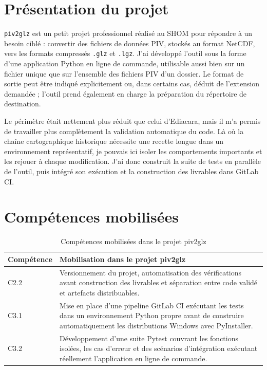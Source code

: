 \section{Présentation du projet}

\texttt{piv2glz} est un petit projet professionnel réalisé au SHOM pour répondre à un besoin ciblé : convertir des fichiers de données PIV, stockés au format NetCDF, vers les formats compressés \texttt{.glz} et \texttt{.lgz}. J'ai développé l'outil sous la forme d'une application Python en ligne de commande, utilisable aussi bien sur un fichier unique que sur l'ensemble des fichiers PIV d'un dossier. Le format de sortie peut être indiqué explicitement ou, dans certains cas, déduit de l'extension demandée ; l'outil prend également en charge la préparation du répertoire de destination.

Le périmètre était nettement plus réduit que celui d'Ediacara, mais il m'a permis de travailler plus complètement la validation automatique du code. Là où la chaîne cartographique historique nécessite une recette longue dans un environnement représentatif, je pouvais ici isoler les comportements importants et les rejouer à chaque modification. J'ai donc construit la suite de tests en parallèle de l'outil, puis intégré son exécution et la construction des livrables dans GitLab CI.

\section{Compétences mobilisées}

\begin{table}[H]
\centering
\begin{tabular}{p{3cm} p{11cm}}
\toprule
\textbf{Compétence} & \textbf{Mobilisation dans le projet piv2glz} \\
\midrule
C2.2 & Versionnement du projet, automatisation des vérifications avant construction des livrables et séparation entre code validé et artefacts distribuables. \\
C3.1 & Mise en place d'une pipeline GitLab CI exécutant les tests dans un environnement Python propre avant de construire automatiquement les distributions Windows avec PyInstaller. \\
C3.2 & Développement d'une suite Pytest couvrant les fonctions isolées, les cas d'erreur et des scénarios d'intégration exécutant réellement l'application en ligne de commande. \\
\bottomrule
\end{tabular}
\caption{Compétences mobilisées dans le projet piv2glz}
\label{tab:competences-piv2glz}
\end{table}

